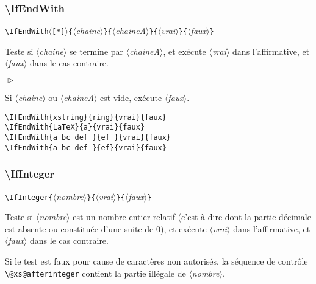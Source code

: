 \documentclass[a4paper,10pt]{article}
\newcommand\argu[1]{$\langle$\textit{#1}$\rangle$}
\newcommand\ARGU[1]{\texttt{\color{black}\{}\argu{#1}\texttt{\color{black}\}}}
\newcommand\etoile{$\langle$\texttt{[*]}$\rangle$}
\newenvironment{Conditions}[1][1cm]%
{\begin{list}%
	{$\vartriangleright$}%
	{\setlength{\leftmargin}{#1}
	 \setlength{\itemsep}{0pt}
	 \setlength{\parsep}{0pt}
	 \setlength{\topsep}{2ptplus3ptminus2pt}
	}}%
{\end{list}}
\newcommand\styleexemple{\small\vskip4pt}
\newcommand\verbinline{\lstinline[basicstyle=\normalsize\ttfamily]}
\begin{document}
\subsubsection{\ttfamily\textbackslash IfEndWith}
\verbinline|\IfEndWith|\etoile\ARGU{chaine}\ARGU{chaineA}\ARGU{vrai}\ARGU{faux}
\smallskip

Teste si \argu{chaine} se termine par \argu{chaineA}, et exécute \argu{vrai} dans l'affirmative, et \argu{faux} dans le cas contraire.\medskip

\begin{Conditions}
	\item Si \argu{chaine} ou \argu{chaineA} est vide, exécute \argu{faux}.
\end{Conditions}

\begin{minipage}[t]{0.65\linewidth}
\begin{lstlisting}
\IfEndWith{xstring}{ring}{vrai}{faux}
\IfEndWith{LaTeX}{a}{vrai}{faux}
\IfEndWith{a bc def }{ef }{vrai}{faux}
\IfEndWith{a bc def }{ef}{vrai}{faux}
\end{lstlisting}%
\end{minipage}\hfill
\begin{minipage}[t]{0.35\linewidth}
	\styleexemple
	\par
	\par
	\par
\end{minipage}%

\subsubsection{\ttfamily\textbackslash IfInteger}
\verbinline|\IfInteger|\ARGU{nombre}\ARGU{vrai}\ARGU{faux}
\smallskip

Teste si \argu{nombre} est un nombre entier relatif (c'est-à-dire dont la partie décimale est absente ou constituée d'une suite de 0), et exécute \argu{vrai} dans l'affirmative, et \argu{faux} dans le cas contraire.\par\nobreak\smallskip
Si le test est faux pour cause de caractères non autorisés, la séquence de contrôle \verb|\@xs@afterinteger| contient la partie illégale de \argu{nombre}.\medskip
\end{document}
